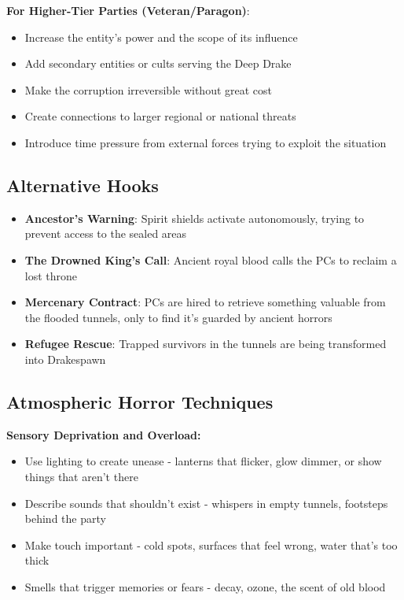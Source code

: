 \documentclass[11pt]{article}
\begin{document}
\textbf{For Higher-Tier Parties (Veteran/Paragon)}:
\begin{itemize}
\item Increase the entity's power and the scope of its influence
\item Add secondary entities or cults serving the Deep Drake
\item Make the corruption irreversible without great cost
\item Create connections to larger regional or national threats
\item Introduce time pressure from external forces trying to exploit the situation
\end{itemize}

\subsection{Alternative Hooks}

\begin{itemize}
\item \textbf{Ancestor's Warning}: Spirit shields activate autonomously, trying to prevent access to the sealed areas
\item \textbf{The Drowned King's Call}: Ancient royal blood calls the PCs to reclaim a lost throne
\item \textbf{Mercenary Contract}: PCs are hired to retrieve something valuable from the flooded tunnels, only to find it's guarded by ancient horrors
\item \textbf{Refugee Rescue}: Trapped survivors in the tunnels are being transformed into Drakespawn
\end{itemize}

\subsection{Atmospheric Horror Techniques}

\textbf{Sensory Deprivation and Overload:}
\begin{itemize}
\item Use lighting to create unease - lanterns that flicker, glow dimmer, or show things that aren't there
\item Describe sounds that shouldn't exist - whispers in empty tunnels, footsteps behind the party
\item Make touch important - cold spots, surfaces that feel wrong, water that's too thick
\item Smells that trigger memories or fears - decay, ozone, the scent of old blood
\end{itemize}
\end{document}
